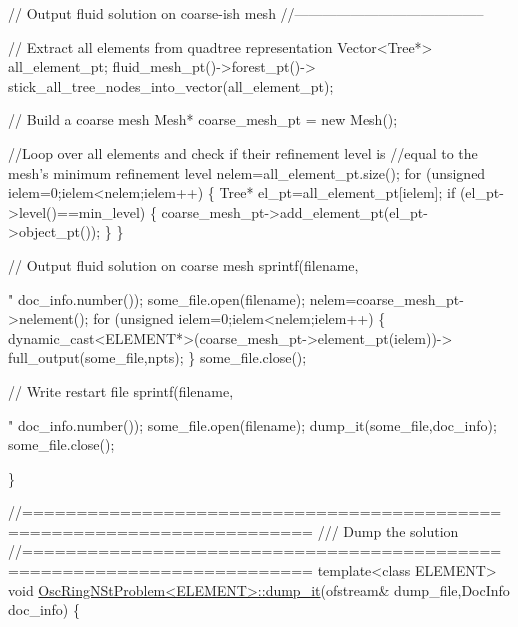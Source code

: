 \begin{DoxyCodeInclude}
{{{ \textcolor{comment}{// Output fluid solution on coarse-ish mesh }
 \textcolor{comment}{//-----------------------------------------}

 \textcolor{comment}{// Extract all elements from quadtree representation}
 Vector<Tree*> all\_element\_pt;
 fluid\_mesh\_pt()->forest\_pt()->
  stick\_all\_tree\_nodes\_into\_vector(all\_element\_pt);

 \textcolor{comment}{// Build a coarse mesh}
 Mesh* coarse\_mesh\_pt = \textcolor{keyword}{new} Mesh();

 \textcolor{comment}{//Loop over all elements and check if their refinement level is}
 \textcolor{comment}{//equal to the mesh's minimum refinement level}
 nelem=all\_element\_pt.size();
 \textcolor{keywordflow}{for} (\textcolor{keywordtype}{unsigned} ielem=0;ielem<nelem;ielem++)
  \{
   Tree* el\_pt=all\_element\_pt[ielem];
   \textcolor{keywordflow}{if} (el\_pt->level()==min\_level)
    \{
     coarse\_mesh\_pt->add\_element\_pt(el\_pt->object\_pt());
    \}
  \}

 \textcolor{comment}{// Output fluid solution on coarse mesh}
 sprintf(filename,\textcolor{stringliteral}{"%
         doc\_info.number());
 some\_file.open(filename);
 nelem=coarse\_mesh\_pt->nelement();
 \textcolor{keywordflow}{for} (\textcolor{keywordtype}{unsigned} ielem=0;ielem<nelem;ielem++)
  \{
   \textcolor{keyword}{dynamic\_cast<}ELEMENT*\textcolor{keyword}{>}(coarse\_mesh\_pt->element\_pt(ielem))->
    full\_output(some\_file,npts);
  \}
 some\_file.close();

 \textcolor{comment}{// Write restart file}
 sprintf(filename,\textcolor{stringliteral}{"%
         doc\_info.number());
 some\_file.open(filename);
 dump\_it(some\_file,doc\_info);
 some\_file.close();

\}






\textcolor{comment}{//========================================================================}\textcolor{comment}{}
\textcolor{comment}{/// Dump the solution}
\textcolor{comment}{}\textcolor{comment}{//========================================================================}
\textcolor{keyword}{template}<\textcolor{keyword}{class} ELEMENT>
\textcolor{keywordtype}{void} \hyperlink{classOscRingNStProblem_af32f94658174188b1f029446161755b2}{OscRingNStProblem<ELEMENT>::dump\_it}(ofstream& dump\_file,DocInfo 
      doc\_info)
\{

}}}}}
\end{DoxyCodeInclude}
